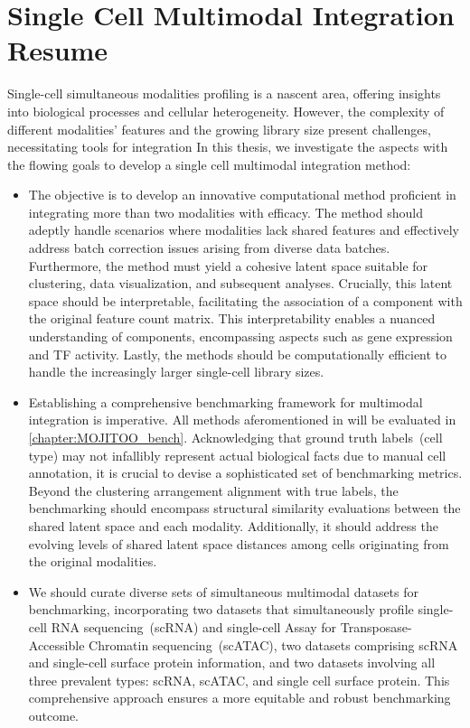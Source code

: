 \section{Single Cell Multimodal Integration Resume}
Single-cell simultaneous modalities profiling is a nascent area, offering insights into biological processes and cellular heterogeneity. However, the complexity of different modalities' features and the growing library size present challenges, necessitating tools for integration In this thesis, we investigate the aspects with the flowing goals to develop a single cell multimodal integration method:

\begin{itemize}
	\item
	The objective is to develop an innovative computational method proficient in integrating more than two modalities with efficacy. The method should adeptly handle scenarios where modalities lack shared features and effectively address batch correction issues arising from diverse data batches. Furthermore, the method must yield a cohesive latent space suitable for clustering, data visualization, and subsequent analyses. Crucially, this latent space should be interpretable, facilitating the association of a component with the original feature count matrix. This interpretability enables a nuanced understanding of components, encompassing aspects such as gene expression and TF activity. Lastly, the methods should be computationally efficient to handle the increasingly larger single-cell library sizes.
	\item
	Establishing a comprehensive benchmarking framework for multimodal integration is imperative. All methods aferomentioned in  will be evaluated in \cref{chapter:MOJITOO_bench}. Acknowledging that ground truth labels~(cell type) may not infallibly represent actual biological facts due to manual cell annotation, it is crucial to devise a sophisticated set of benchmarking metrics. Beyond the clustering arrangement alignment with true labels, the benchmarking should encompass structural similarity evaluations between the shared latent space and each modality. Additionally, it should address the evolving levels of shared latent space distances among cells originating from the original modalities.

	\item
	We should curate diverse sets of simultaneous multimodal datasets for benchmarking, incorporating two datasets that simultaneously profile single-cell RNA sequencing~(scRNA) and single-cell Assay for Transposase-Accessible Chromatin sequencing~(scATAC), two datasets comprising scRNA and single-cell surface protein information, and two datasets involving all three prevalent types: scRNA, scATAC, and single cell surface protein. This comprehensive approach ensures a more equitable and robust benchmarking outcome.


\end{itemize}
